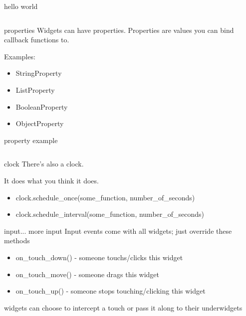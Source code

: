 \documentclass{beamer}
\begin{document}
\begin{frame}[fragile]{hello world}
  \inputminted{python}{hello_world.py}
\end{frame}


\begin{frame}{properties}
  Widgets can have properties. Properties are values you can bind callback functions to.
  \pause

  Examples:
    \begin{itemize}
    \item StringProperty
    \pause
    \item ListProperty
    \pause
    \item BooleanProperty
    \pause
    \item ObjectProperty
    \end{itemize}
\end{frame}


\begin{frame}[fragile]{property example}
  \inputminted{python}{property_example.py}
\end{frame}




\begin{frame}{clock}
There's also a clock.
\pause

It does what you think it does.

\pause
\begin{itemize}
  \item clock.schedule\_once(some\_function, number\_of\_seconds)
  \pause
  \item clock.schedule\_interval(some\_function, number\_of\_seconds)
  \pause
\end{itemize}
\end{frame}


\begin{frame}{input... more input}
  Input events come with all widgets; just override these methods

  \pause
  \begin{itemize}
  \item on\_touch\_down()  - someone touchs/clicks this widget
  \pause
  \item on\_touch\_move()  - someone drags this widget
  \pause
  \item on\_touch\_up()    - someone stops touching/clicking this widget
  \pause
\end{itemize}
widgets can choose to intercept a touch or pass it along to their underwidgets
\end{frame}
\end{document}
